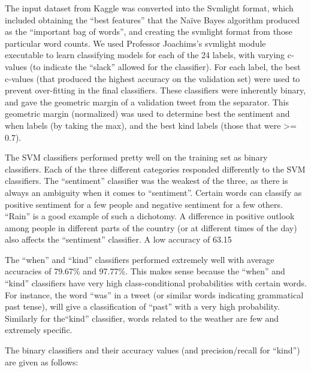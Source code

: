The input dataset from Kaggle was converted into the Svmlight format, which included obtaining the ``best features'' that the Naïve Bayes algorithm produced as the ``important bag of words'', and creating the svmlight format from those particular word counts. We used Professor Joachims’s svmlight module executable to learn classifying models for each of the 24 labels, with varying c-values (to indicate the ``slack'' allowed for the classifier). For each label, the best c-values (that produced the highest accuracy on the validation set) were used to prevent over-fitting in the final classifiers. These classifiers were inherently binary, and gave the geometric margin of a validation tweet from the separator. This geometric margin (normalized) was used to determine best the sentiment and when labels (by taking the max), and the best kind labels (those that were >= 0.7).
 
 
The SVM classifiers performed pretty well on the training set as binary classifiers. Each of the three different categories responded differently to the SVM classifiers. The ``sentiment'' classifier was the weakest of the three, as there is always an ambiguity when it comes to ``sentiment''. Certain words can classify as positive sentiment for a few people and negative sentiment for a few others. ``Rain'' is a good example of such a dichotomy. A difference in positive outlook among people in different parts of the country (or at different times of the day) also affects the ``sentiment'' classifier. A low accuracy of 63.15%
 
The ``when'' and ``kind'' classifiers performed extremely well with average accuracies of 79.67\% and 97.77\%. This makes sense because the ``when'' and “kind” classifiers have very high class-conditional probabilities with certain words. For instance, the word ``was'' in a tweet (or similar words indicating grammatical past tense), will give a classification of “past” with a very high probability. Similarly for the``kind'' classifier, words related to the weather are few and extremely specific.
 
The binary classifiers and their accuracy values (and precision/recall for ``kind'') are given as follows:

